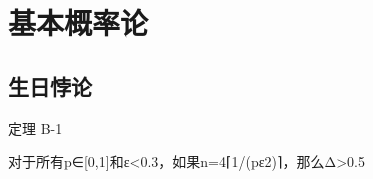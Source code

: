 \chapter{基本概率论}

\section{生日悖论}\label{sec:B-1}

\begin{theorem}\label{theo:B-1}
	定理 B-1
\end{theorem}

\begin{theorem}\label{theo:B-3}
对于所有p∈[0,1]和ε<0.3，如果n=4⌈1/(pε2)⌉，那么Δ>0.5
\end{theorem}